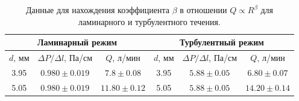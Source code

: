 \begin{table}[h]
\centering
\label{tab:flow_regimes}
\begin{tabular}{|c|c|c|c|c|c|}
\hline
\multicolumn{3}{|c|}{\textbf{Ламинарный режим}} & \multicolumn{3}{c|}{\textbf{Турбулентный режим}} \\ \hline
$d$, мм & $\Delta P/\Delta l$, Па/см & $Q$, л/мин & $d$, мм & $\Delta P/\Delta l$, Па/см & $Q$, л/мин \\ \hline
3.95 & $0.980 \pm 0.019$ & $7.8 \pm 0.08$ & 3.95 & $5.88 \pm 0.05$ & $6.80 \pm 0.07$ \\ \hline
5.05 & $0.980 \pm 0.019$ & $11.80 \pm 0.12$ & 5.05 & $5.88 \pm 0.05$ & $14.20 \pm 0.14$ \\ \hline
\end{tabular}
\caption{\centering Данные для нахождения коэффициента $\beta$ в отношении $Q \propto R^\beta$ для ламинарного и турбулентного течения.}
\end{table}
